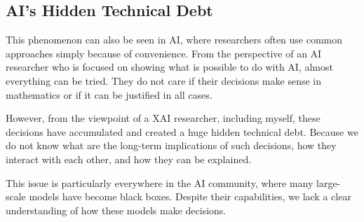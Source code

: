 \subsection{AI's Hidden Technical Debt}
This phenomenon can also be seen in AI, where researchers often use common approaches simply because of convenience.
From the perspective of an AI researcher who is focused on showing what is possible to do with AI, almost everything can be tried.
They do not care if their decisions make sense in mathematics or if it can be justified in all cases.



However, from the viewpoint of a XAI researcher, including myself, these decisions have accumulated and created a huge hidden technical debt.
Because we do not know what are the long-term implications of such decisions, how they interact with each other, and how they can be explained.



This issue is particularly everywhere in the AI community, where many large-scale models have become black boxes. 
Despite their capabilities, we lack a clear understanding of how these models make decisions.
